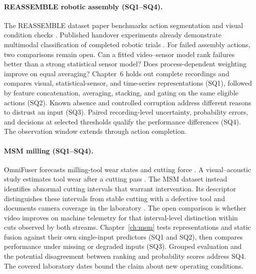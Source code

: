 \paragraph{REASSEMBLE robotic assembly (SQ1--SQ4).}
The REASSEMBLE dataset paper benchmarks action segmentation and visual condition checks \citep[PDF pp.~10--13]{Sliwowski2025REASSEMBLE}. Published handover experiments already demonstrate multimodal classification of completed robotic trials \citep[Table~III]{Thoduka2024Handover}. For failed assembly actions, two comparisons remain open. Can a fitted video--sensor model rank failures better than a strong statistical sensor model? Does process-dependent weighting improve on equal averaging? Chapter~6 holds out complete recordings and compares visual, statistical-sensor, and time-series representations (SQ1), followed by feature concatenation, averaging, stacking, and gating on the same eligible actions (SQ2). Known absence and controlled corruption address different reasons to distrust an input (SQ3). Paired recording-level uncertainty, probability errors, and decisions at selected thresholds qualify the performance differences (SQ4). The observation window extends through action completion.

\paragraph{MSM milling (SQ1--SQ4).}
OmniFuser forecasts milling-tool wear states and cutting force \citep[PDF p.~11, Tables~IV--V]{P021}. A visual--acoustic study estimates tool wear after a cutting pass \citep[PDF p.~24, Table~1]{P045}. The MSM dataset instead identifies abnormal cutting intervals that warrant intervention. Its descriptor distinguishes these intervals from stable cutting with a defective tool and documents camera coverage in the laboratory \citep{Kim2026MSM}. The open comparison is whether video improves on machine telemetry for that interval-level distinction within cuts observed by both streams. Chapter~\ref{ch:msm} tests representations and static fusion against their own single-input predictors (SQ1 and SQ2), then compares performance under missing or degraded inputs (SQ3). Grouped evaluation and the potential disagreement between ranking and probability scores address SQ4. The covered laboratory dates bound the claim about new operating conditions.

